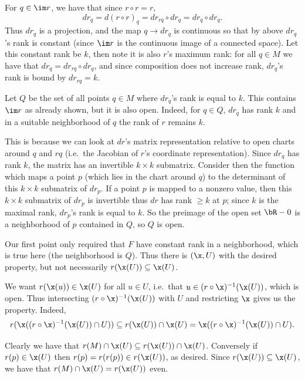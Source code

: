     \item For $q\in\im r$, we have that since $r\circ r=r$,
    $$ dr_q = d(r\circ r)_q = dr_{rq}\circ dr_q = dr_q\circ dr_q . $$
    Thus $dr_q$ is a projection, and the map $q\to dr_q$ is continuous so that by above $dr_q$'s rank is constant (since $\im r$ is the continuous image of a connected space).
    Let this constant rank be $k$, then note it is also $r$'s maximum rank: for all $q\in M$ we have that $dr_q=dr_{rq}\circ dr_q$, and since composition does not increase rank,
    $dr_q$'s rank is bound by $dr_{rq}=k$.

    Let $Q$ be the set of all points $q\in M$ where $dr_q$'s rank is equal to $k$.
    This contains $\im r$ as already shown, but it is also open.
    Indeed, for $q\in Q$, $dr_q$ has rank $k$ and in a suitable neighborhood of $q$ the rank of $r$ remains $k$.

    This is because we can look at $dr$'s matrix representation relative to open charts around $q$ and $rq$ (i.e.\ the Jacobian of $r$'s coordinate representation).
    Since $dr_q$ has rank $k$, the matrix has an invertible $k\times k$ submatrix.
    Consider then the function which maps a point $p$ (which lies in the chart around $q$) to the determinant of this $k\times k$ submatrix of $dr_p$.
    If a point $p$ is mapped to a nonzero value, then this $k\times k$ submatrix of $dr_p$ is invertible thus $dr$ has rank $\geq k$ at $p$; since $k$ is the maximal rank, $dr_p$'s
    rank is equal to $k$.
    So the preimage of the open set $\bR-0$ is a neighborhood of $p$ contained in $Q$, so $Q$ is open.

    \item Our first point only required that $F$ have constant rank in a neighborhood, which is true here (the neighborhood is $Q$).
    Thus there is $(\x,U)$ with the desired property, but not necessarily $r(\x(U))\subseteq\x(U)$.

    We want $r(\x(u))\in\x(U)$ for all $u\in U$, i.e.\ that $u\in(r\circ\x)^{-1}(\x(U))$, which is open.
    Thus intersecting $(r\circ\x)^{-1}(\x(U))$ with $U$ and restricting $\x$ gives us the property.
    Indeed,
    $$ r(\x((r\circ\x)^{-1}(\x(U))\cap U)) \subseteq r(\x(U))\cap\x(U) = \x((r\circ\x)^{-1}(\x(U))\cap U) . $$

    \item Clearly we have that $r(M)\cap\x(U)\subseteq r(\x(U))\cap\x(U)$.
    Conversely if $r(p)\in\x(U)$ then $r(p)=r(r(p))\in r(\x(U))$, as desired.
    Since $r(\x(U))\subseteq\x(U)$, we have that $r(M)\cap\x(U)=r(\x(U))$ even.

